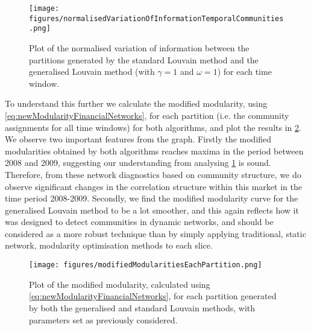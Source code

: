 \begin{figure}
	\centering
	\texttt{[image: figures/normalisedVariationOfInformationTemporalCommunities.png]}
	\caption[Plot of the normalised variation of information between the partitions generated by the standard and generalised Louvain methods for each time window.]{\label{fig:normalisedVariationOfInformationTemporalCommunities} Plot of the normalised variation of information between the partitions generated by the standard Louvain method and the generalised Louvain method (with $\gamma = 1$ and $\omega=1$) for each time window.}
\end{figure}

To understand this further we calculate the modified modularity, using \cref{eq:newModularityFinancialNetworks}, for each partition (i.e. the community assignments for all time windows) for both algorithms, and plot the results in \cref{fig:modifiedModularitiesEachPartition}.
We observe two important features from the graph.
Firstly the modified modularities obtained by both algorithms reaches maxima in the period between 2008 and 2009, suggesting our understanding from analysing \cref{fig:normalisedVariationOfInformationTemporalCommunities} is sound.
Therefore, from these network diagnostics based on community structure, we do observe significant changes in the correlation structure within this market in the time period 2008-2009.
Secondly, we find the modified modularity curve for the generalised Louvain method to be a lot smoother, and this again reflects how it was designed to detect communities in dynamic networks, and should be considered as a more robust technique than by simply applying traditional, static network, modularity optimisation methods to each slice.

\begin{figure}
	\centering
	\texttt{[image: figures/modifiedModularitiesEachPartition.png]}
	\caption[Plot of the modified modularity for each partition generated by both the generalised and standard Louvain methods.]{\label{fig:modifiedModularitiesEachPartition} Plot of the modified modularity, calculated using \cref{eq:newModularityFinancialNetworks}, for each partition generated by both the generalised and standard Louvain methods, with parameters set as previously considered.}
\end{figure}